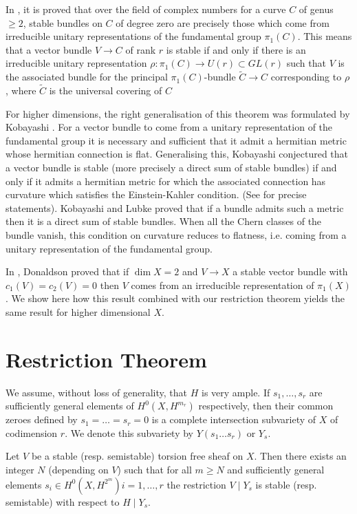 In \cite{key5}, it is proved that over the field of complex numbers for a curve $C$ of genus $\geq 2$, stable bundles on $C$ of degree zero are precisely those which come from irreducible unitary representations of the fundamental group $\pi_1(C)$. This means that a vector bundle $V\to C$ of rank $r$ is stable if and only if there is an irreducible unitary representation $\rho:\pi_1(C)\to U(r)\subset GL(r)$ such that $V$ is the associated bundle for the principal $\pi_1(C)$-bundle $\widetilde{C}\to C$ corresponding to $\rho$, where $\widetilde{C}$ is the universal covering of $C$ 

For higher dimensions, the right generalisation of this theorem was formulated by Kobayashi \cite{key2}. For a vector bundle to come from a unitary representation of the fundamental group it is necessary and sufficient that it admit a hermitian metric whose hermitian connection is flat. Generalising this, Kobayashi conjectured that a vector bundle is stable (more precisely a direct sum of stable bundles) if and only if it admits a hermitian metric for which the associated connection has curvature which satisfies the Einstein-Kahler condition. (See \cite{key2}\pageoriginale for precise statements). Kobayashi and Lubke proved that if a bundle admits such a metric then it is a direct sum of stable bundles. When all the Chern classes of the bundle vanish, this condition on curvature reduces to flatness, i.e. coming from a unitary representation of the fundamental group. 

In \cite{key1}, Donaldson proved that if $\dim X=2$ and $V\to X$ a stable vector bundle with  $c_1(V)=c_2(V)=0$ then $V$ comes from an irreducible representation of $\pi_1(X)$. We show here how this result combined with our restriction theorem yields the same result for higher dimensional $X$. 

\section{Restriction Theorem}\label{s2}

We assume, without loss of generality, that $H$ is very ample. If $s_1,\ldots,s_r$ are sufficiently general elements of $H^{0}\left(X,H^{m_r}\right)$ respectively, then their common zeroes defined by $s_1=\ldots=s_r=0$ is a complete intersection subvariety of $X$ of codimension $r$. We denote this subvariety by $Y(s_1\ldots s_r)$ or $Y_s$. 

\begin{thm}\label{thm1}
Let $V$ be a stable (resp. semistable) torsion free sheaf on $X$. Then there exists an integer $N$ (depending on $V$) such that for all $m\geq N$ and sufficiently general elements $s_i\in H^{0}\left(X,H^{2^{m}}\right)i=1,\ldots,r$ the restriction $V\mid Y_s$ is stable (resp. semistable) with respect to $H\mid Y_{s}$. 
\end{thm}


